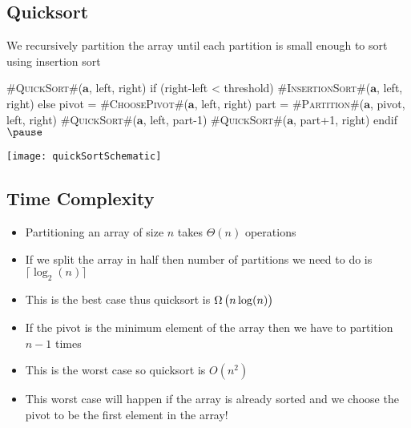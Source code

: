 
\begin{slide}
\section[-2]{Quicksort}

\begin{PauseHighLight}
  We recursively partition the array until each partition is small
  enough to sort using insertion sort\pause
  \begin{pseudo}
#\textsc{QuickSort}#($\bm{a}$, left, right) {
   if (right-left < threshold)
      #\textsc{InsertionSort}#($\bm{a}$, left, right)
   else
      pivot = #\textsc{ChoosePivot}#($\bm{a}$, left, right)
      part = #\textsc{Partition}#($\bm{a}$, pivot, left, right)
      #\textsc{QuickSort}#($\bm{a}$, left, part-1)
      #\textsc{QuickSort}#($\bm{a}$, part+1, right)
   endif$\pause$
}
  \end{pseudo}
\vspace{-1cm}
  \color{TextColor}
  \begin{center}
    \texttt{[image: quickSortSchematic]}\pause
  \end{center}
\end{PauseHighLight}

\end{slide}


\begin{slide}
\section{Time Complexity}

\begin{PauseHighLight}
  \begin{itemize}
  \item Partitioning an array of size $n$ takes $\Theta(n)$ operations\pause
  \item If we split the array in half then number of partitions we need
    to do is $\lceil \log_2(n) \rceil$\pause
  \item This is the best case thus quicksort is $\Omega\left(\strut
      n\log(n) \right)$\pause
  \item If the pivot is the minimum element of the array then we have to
    partition $n-1$ times\pause
  \item This is the worst case so quicksort is $O\left(n^2\right)$\pause
  \item This worst case will happen if the array is already sorted and
    we choose the pivot to be the first element in the array!\pause
  \end{itemize}
\end{PauseHighLight}

\end{slide}




